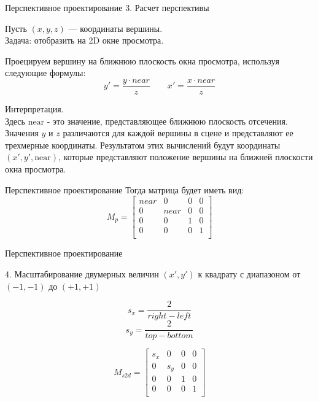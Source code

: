 \documentclass{beamer}
\begin{document}
	\begin{frame}{Перспективное проектирование}
		3. Расчет перспективы

		Пусть $(x, y, z)$ --- координаты вершины. \\ 
		Задача: отобразить на 2D окне просмотра.

    Проецируем вершину на ближнюю плоскость окна просмотра, используя следующие формулы:
        \[
					y' = \frac{y \cdot near}{z} 
				\qquad
					x' = \frac {x \cdot near} {z}
				\]

		Интерпретация. \\
    Здесь $\text{near}$ - это значение, представляющее ближнюю плоскость отсечения. Значения $y$ и $z$ различаются для каждой вершины в сцене и представляют ее трехмерные координаты. Результатом этих вычислений будут координаты $(x', y', \text{near})$, которые представляют положение вершины на ближней плоскости окна просмотра.


	\end{frame}

	\begin{frame}{Перспективное проектирование}
		Тогда матрица будет иметь вид:
 \[
	M_p = 
	 \begin{bmatrix}
		near & 0 & 0 & 0 \\
		0 & near & 0 & 0 \\
		0 & 0 & 1 & 0 \\
		0 & 0 & 0 & 1 \\
	\end{bmatrix}	
	\]
	\end{frame}

	\begin{frame}{Перспективное проектирование}

		4. Масштабирование двумерных величин $(x', y')$ к квадрату с диапазоном от $(-1, -1)$ до $(+1, +1)$

		\[
			s_x = \frac{2}{right - left}
		\]
		\[
			s_y = \frac{2}{top - bottom}
		\]

		\[
			M_{s2d} = 
			\begin{bmatrix}
				s_x & 0 & 0 & 0 \\
				0 & s_y & 0 & 0 \\
				0 & 0 & 1 & 0 \\
				0 & 0 & 0 & 1 \\
			\end{bmatrix}	
		\]
	\end{frame}
\end{document}
